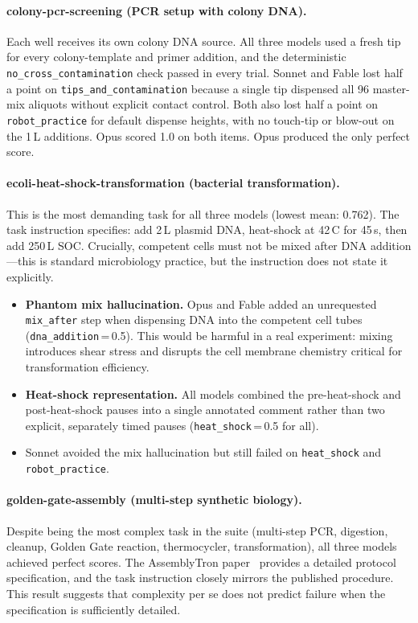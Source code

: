 \documentclass[11pt,a4paper]{article}
\begin{document}
\paragraph{colony-pcr-screening (PCR setup with colony DNA).}
Each well receives its own colony DNA source.
All three models used a fresh tip for every colony-template and primer
addition, and the deterministic \texttt{no\_cross\_contamination} check
passed in every trial.
Sonnet and Fable lost half a point on \texttt{tips\_and\_contamination}
because a single tip dispensed all 96 master-mix aliquots without explicit
contact control.
Both also lost half a point on \texttt{robot\_practice} for default
dispense heights, with no touch-tip or blow-out on the 1\,\textmu L
additions.
Opus scored 1.0 on both items.
Opus produced the only perfect score.

\paragraph{ecoli-heat-shock-transformation (bacterial transformation).}
This is the most demanding task for all three models (lowest mean: 0.762).
The task instruction specifies: add 2\,\textmu L plasmid DNA, heat-shock at
42\,\textdegree C for 45\,s, then add 250\,\textmu L SOC.
Crucially, competent cells must not be mixed after DNA addition---this is
standard microbiology practice, but the instruction does not state it
explicitly.

\begin{itemize}[leftmargin=*]
  \item \textbf{Phantom mix hallucination.} Opus and Fable added an
    unrequested \texttt{mix\_after} step when dispensing DNA into the
    competent cell tubes (\texttt{dna\_addition}\,=\,0.5). This would be
    harmful in a real experiment: mixing introduces shear stress and
    disrupts the cell membrane chemistry critical for transformation
    efficiency.
  \item \textbf{Heat-shock representation.} All models combined the
    pre-heat-shock and post-heat-shock pauses into a single annotated
    comment rather than two explicit, separately timed pauses
    (\texttt{heat\_shock}\,=\,0.5 for all).
  \item Sonnet avoided the mix hallucination but still failed on
    \texttt{heat\_shock} and \texttt{robot\_practice}.
\end{itemize}

\paragraph{golden-gate-assembly (multi-step synthetic biology).}
Despite being the most complex task in the suite (multi-step PCR, digestion,
cleanup, Golden Gate reaction, thermocycler, transformation), all three
models achieved perfect scores.
The AssemblyTron paper~\citep{assemblytron2023} provides a detailed protocol
specification, and the task instruction closely mirrors the published
procedure.
This result suggests that complexity per se does not predict failure when the
specification is sufficiently detailed.
\end{document}

